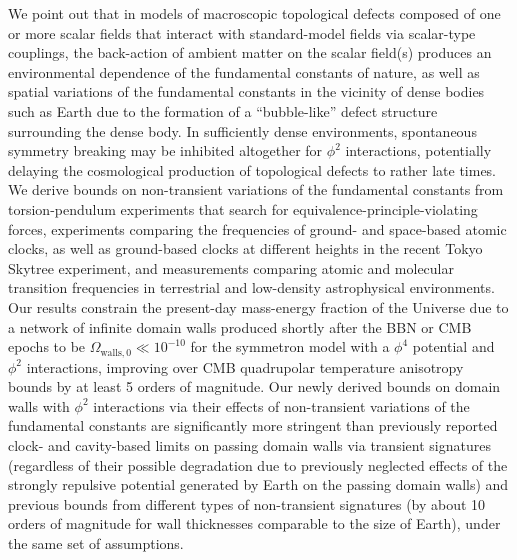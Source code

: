 \documentclass[aps,prd,onecolumn,nofootinbib]{revtex4-2} %
\begin{document}
We point out that in models of macroscopic topological defects composed of one or more scalar fields that interact with standard-model fields via scalar-type couplings, the back-action of ambient matter on the scalar field(s) produces an environmental dependence of the fundamental constants of nature, as well as spatial variations of the fundamental constants in the vicinity of dense bodies such as Earth due to the formation of a ``bubble-like'' defect structure surrounding the dense body. 
In sufficiently dense environments, spontaneous symmetry breaking may be inhibited altogether for $\phi^2$ interactions, potentially delaying the cosmological production of topological defects to rather late times. 
We derive bounds on non-transient variations of the fundamental constants from torsion-pendulum experiments that search for equivalence-principle-violating forces, experiments comparing the frequencies of ground- and space-based atomic clocks, as well as ground-based clocks at different heights in the recent Tokyo Skytree experiment, and measurements comparing atomic and molecular transition frequencies in terrestrial and low-density astrophysical environments. 
Our results constrain the present-day mass-energy fraction of the Universe due to a network of infinite domain walls produced shortly after the BBN or CMB epochs to be $\Omega_{\textrm{walls},0} \ll 10^{-10}$ for the symmetron model with a $\phi^4$ potential and $\phi^2$ interactions, improving over CMB quadrupolar temperature anisotropy bounds by at least 5 orders of magnitude. 
Our newly derived bounds on domain walls with $\phi^2$ interactions via their effects of non-transient variations of the fundamental constants are significantly more stringent than previously reported clock- and cavity-based limits on passing domain walls via transient signatures (regardless of their possible degradation due to previously neglected effects of the strongly repulsive potential generated by Earth on the passing domain walls) and previous bounds from different types of non-transient signatures (by about 10 orders of magnitude for wall thicknesses comparable to the size of Earth), under the same set of assumptions. 



\vspace{200mm}






\large


\tableofcontents
\vspace{200mm}
\end{document}
